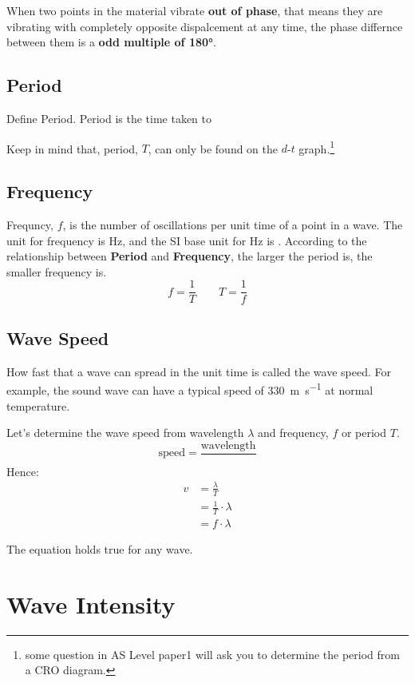 \documentclass[a4paper]{tufte-handout}
\newenvironment{ExampleBox} %
{\begin{tcolorbox}[breakable,colback=g1!30,colframe=g1,title=Example]} {\end{tcolorbox}}
\newenvironment{SummBox}
{\begin{tcolorbox}[breakable,colback=r1!30,colframe=r1,title=Summary]} {\end{tcolorbox}}
\begin{document}
When two points in the material vibrate \textbf{out of phase}, that means they are vibrating with completely opposite dispalcement at any time, the phase differnce between them is a \textbf{odd multiple of \ang{180}}.

\subsection{Period}
\begin{SummBox}
Define Period.
\tcblower
Period is the time taken to \uline{\hfill}
\end{SummBox}
Keep in mind that, period, $T$, can only be found on the $d$-$t$ graph.\footnote{some question in AS Level paper1  will ask you to determine the period from a CRO diagram.}

\subsection{Frequency}
Frequncy, $f$, is the number of oscillations per unit time of a point in a wave. The unit for frequency is \si{\hertz}, and the SI base unit for \si{\hertz} is \uline{\hspace{1in}}.
According to the relationship between \textbf{Period} and \textbf{Frequency}, the larger the period is, the smaller frequency is.
\[
  f= \frac{1}{T} \qquad T=\frac{1}{f}
\]

\subsection{Wave Speed}
How fast that a wave can spread in the unit time is called the wave speed. For example, the sound wave can have a typical speed of \SI{330}{\m\per\s} at normal temperature.
\begin{ExampleBox}
Let's determine the wave speed from wavelength $\lambda$ and frequency, $f$ or period $T$.
\tcblower
\[
  \text{speed} = \frac{\text{wavelength}}{\textbf{}}
\]
Hence:
\begin{align*}
        v & = \frac{\lambda}{T}\\
          & = \frac{1}{T}\cdot\lambda \\
          & = f\cdot \lambda
\end{align*}
\end{ExampleBox} 
The equation holds true for any wave.

\section{Wave Intensity}
\end{document}
